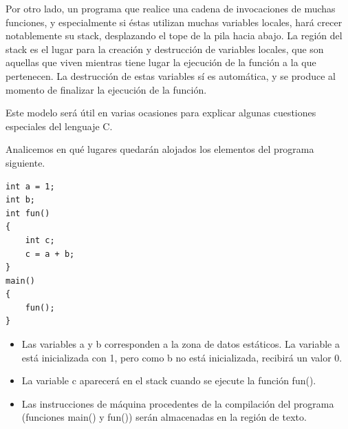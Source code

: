 Por otro lado, un programa que realice una cadena de invocaciones de muchas funciones, y
especialmente si éstas utilizan muchas variables locales, hará crecer notablemente su stack,
desplazando el tope de la pila hacia abajo. La región del stack es el lugar para la creación y destrucción
de variables locales, que son aquellas que viven mientras tiene lugar la ejecución de la función a la que
pertenecen. La destrucción de estas variables sí es automática, y se produce al momento de finalizar la
ejecución de la función.

Este modelo será útil en varias ocasiones para explicar algunas cuestiones especiales del lenguaje C.


\begin{ejemplo}
Analicemos en qué lugares quedarán alojados los elementos del programa siguiente.

\begin{lstlisting}
int a = 1;
int b;
int fun()
{
	int c;
	c = a + b;
}
main()
{
	fun();
}
\end{lstlisting} 

\begin{itemize}
	\item Las variables a y b corresponden a la zona de datos estáticos. La variable a está inicializada con 1, pero como b no está inicializada, recibirá un valor 0.
\item La variable c aparecerá en el stack cuando se ejecute la función fun().
\item Las instrucciones de máquina procedentes de la compilación del programa (funciones main() y fun()) serán almacenadas en la región de texto. 

\end{itemize}\end{ejemplo}



